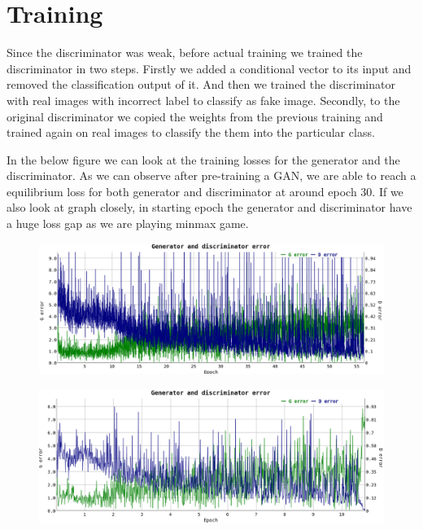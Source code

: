 \section{Training}
Since the discriminator was weak, before actual training we trained the discriminator in two steps. Firstly we added a conditional vector to its input and removed the classification output of it. And then we trained the discriminator with real images with incorrect label to classify as fake image. Secondly, to the original discriminator we copied the weights from the previous training and trained again on real images to classify the them into the particular class.  
\par

In the below figure we can look at the training losses for the generator and the discriminator. As we can observe after pre-training a GAN, we are able to reach a equilibrium loss for both generator and discriminator at around epoch 30. If we also look at graph closely, in starting epoch the generator and discriminator have a huge loss gap as we are playing minmax game. 

\begin{figure}[H]
  \centering
    \includegraphics[scale=.4, angle=0]{Files/Training-2.png}
    \caption[Generator Discrminator Loss for Celeba dataset]{}
    \label{fig:train-celeba}
\end{figure}

\begin{figure}[H]
  \centering
    \includegraphics[scale=.4, angle=0]{Files/MNIST-GAN.png}
    \caption[Generator Discrminator Loss for MNIST dataset]{}
    \label{fig:train-mnist}
\end{figure}
